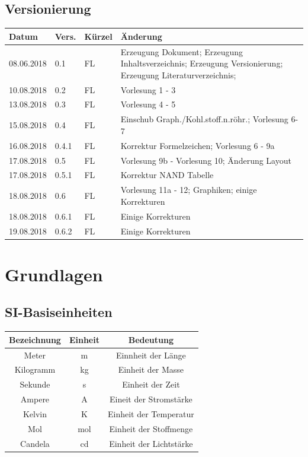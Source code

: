 \documentclass[12pt,a4paper]{report}%
\numberwithin{equation}{section}
\numberwithin{equation}{subsection}
\begin{document}
\section*{Versionierung}
\begin{tabular}{|p{2cm}|p{1cm}|p{1.5cm}|p{8.5cm}|}\hline
Datum & Vers. & Kürzel & Änderung \\ \hline
08.06.2018 & 0.1 & FL & Erzeugung Dokument; Erzeugung Inhaltsverzeichnis; Erzeugung Versionierung; Erzeugung Literaturverzeichnis;\\ \hline
10.08.2018 & 0.2 & FL & Vorlesung 1 - 3 \\ \hline
13.08.2018 & 0.3 & FL & Vorlesung 4 - 5 \\  \hline
15.08.2018 & 0.4 & FL & Einschub Graph./Kohl.stoff.n.röhr.; Vorlesung 6-7 \\ \hline
16.08.2018 & 0.4.1 & FL & Korrektur Formelzeichen; Vorlesung 6 - 9a \\ \hline
17.08.2018 & 0.5 & FL & Vorlesung 9b - Vorlesung 10; Änderung Layout \\ \hline
17.08.2018 & 0.5.1 & FL & Korrektur NAND Tabelle \\ \hline
18.08.2018 & 0.6 & FL & Vorlesung 11a - 12; Graphiken; einige Korrekturen \\
18.08.2018 & 0.6.1 & FL & Einige Korrekturen \\ \hline
19.08.2018 & 0.6.2 & FL & Einige Korrekturen \\ \hline
\end{tabular}
\listoffigures

 
\chapter{Grundlagen}
	\section{SI-Basiseinheiten}
	\begin{table}[H]
		\centering
		\begin{tabular} {|c|c|c|}\hline
			Bezeichnung & Einheit & Bedeutung \\ \hline
			Meter & m & Einnheit der Länge \\ \hline
			Kilogramm & kg & Einheit der Masse \\ \hline
			Sekunde & s & Einheit der Zeit \\ \hline
			Ampere & A & Eineit der Stromstärke \\ \hline
			Kelvin & K & Einheit der Temperatur \\ \hline
			Mol & mol & Einheit der Stoffmenge \\ \hline
			Candela & cd & Einheit der Lichtstärke \\ \hline
		\end{tabular}
	\end{table}
\end{document}

